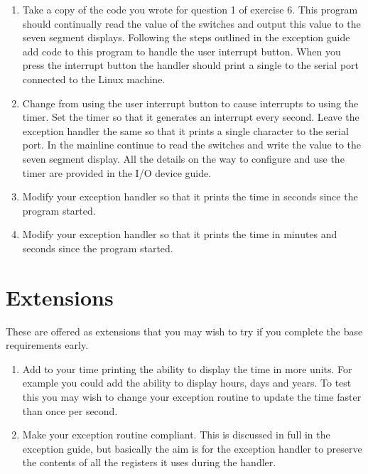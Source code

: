 \documentclass[a4paper,10pt]{article}
\begin{document}
\begin{enumerate}
\item

Take a copy of the code you wrote for question 1 of exercise 6. This
program should continually read the value of the switches and output
this value to the seven segment displays. Following the steps outlined
in the exception guide add code to this program to handle the user
interrupt button. When you press the interrupt button the handler should print
a single  to the serial port connected to the Linux machine.

\item 

Change from using the user interrupt button to cause interrupts to
using the timer. Set the timer so that it generates an interrupt every
second.  Leave the exception handler the same so that it prints a
single character to the serial port. In the mainline continue to read
the switches and write the value to the seven segment display. All the
details on the way to configure and use the timer are provided in the
I/O device guide.

\item 

Modify your exception handler so that it prints the time in seconds
since the program started.

\item 

Modify your exception handler so that it prints the time in minutes and seconds
since the program started.

\label{ques:final}
\end{enumerate}

\section{Extensions}

These are offered as extensions that you may wish to try if you
complete the base requirements early.

\begin{enumerate}

\item

Add to your time printing the ability to display the time in more
units. For example you could add the ability to display hours, days
and years. To test this you may wish to change your exception routine
to update the time faster than once per second.

\item

Make your exception routine compliant. This is discussed in full in
the exception guide, but basically the aim is for the exception
handler to preserve the contents of all the registers it uses during
the handler.

\end{enumerate}

\thispagestyle{rcsfooters}
\pagestyle{rcsfooters}
\end{document}
